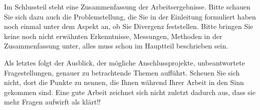 Im Schlussteil steht eine Zusammenfassung der Arbeitsergebnisse.
Bitte schauen Sie sich dazu auch die Problemstellung, die Sie in
der Einleitung formuliert haben noch einmal unter dem Aspekt an,
ob Sie Divergenz feststellen. Bitte bringen Sie keine noch nicht
erwähnten Erkenntnisse, Messungen, Methoden in der Zusammenfassung
unter, alles muss schon im Hauptteil beschrieben sein.

Als letztes folgt der Ausblick, der mögliche Anschlussprojekte,
unbeantwortete Fragestellungen, genauer zu betrachtende Themen
aufführt. Scheuen Sie sich nicht, dort die Punkte zu nennen, die
Ihnen während Ihrer Arbeit in den Sinn gekommen sind. Eine gute
Arbeit zeichnet sich nicht zuletzt dadurch aus, dass sie mehr
Fragen aufwirft als klärt!!
